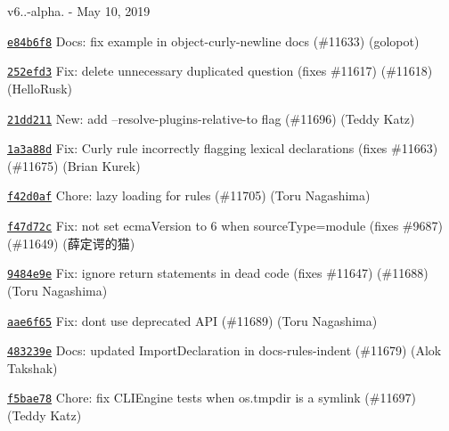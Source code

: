 v6..-\/alpha. -\/ May 10, 2019


\begin{DoxyItemize}
\item \href{https://github.com/eslint/eslint/commit/e84b6f8b171ba4266164688f76d5ee45d278e5c2}{\texttt{ {\ttfamily e84b6f8}}} Docs\+: fix example in object-\/curly-\/newline docs (\#11633) (golopot)
\item \href{https://github.com/eslint/eslint/commit/252efd337b1441debb6d2cc8f51a625549b2c535}{\texttt{ {\ttfamily 252efd3}}} Fix\+: delete unnecessary duplicated question (fixes \#11617) (\#11618) (Hello\+Rusk)
\item \href{https://github.com/eslint/eslint/commit/21dd2116c70b93aa8dd50d2b15e202724b11486a}{\texttt{ {\ttfamily 21dd211}}} New\+: add --resolve-\/plugins-\/relative-\/to flag (\#11696) (Teddy Katz)
\item \href{https://github.com/eslint/eslint/commit/1a3a88df2f952c34631d8e1d83de47178826fce0}{\texttt{ {\ttfamily 1a3a88d}}} Fix\+: Curly rule incorrectly flagging lexical declarations (fixes \#11663) (\#11675) (Brian Kurek)
\item \href{https://github.com/eslint/eslint/commit/f42d0afd89874b459fce1eb1998247d53f9aa42b}{\texttt{ {\ttfamily f42d0af}}} Chore\+: lazy loading for rules (\#11705) (Toru Nagashima)
\item \href{https://github.com/eslint/eslint/commit/f47d72ce2f2edb80cd38810894b9d4bda896bb29}{\texttt{ {\ttfamily f47d72c}}} Fix\+: not set ecma\+Version to 6 when source\+Type=module (fixes \#9687) (\#11649) (薛定谔的猫)
\item \href{https://github.com/eslint/eslint/commit/9484e9ea188ff70683c3112e397c7fddcc3f8095}{\texttt{ {\ttfamily 9484e9e}}} Fix\+: ignore return statements in dead code (fixes \#11647) (\#11688) (Toru Nagashima)
\item \href{https://github.com/eslint/eslint/commit/aae6f6525557ba06e73f051511646056313fcf91}{\texttt{ {\ttfamily aae6f65}}} Fix\+: don\textquotesingle{}t use deprecated A\+PI (\#11689) (Toru Nagashima)
\item \href{https://github.com/eslint/eslint/commit/483239ec74a0c13529fc99547a784b749f41dd54}{\texttt{ {\ttfamily 483239e}}} Docs\+: updated Import\+Declaration in docs-\/rules-\/indent (\#11679) (Alok Takshak)
\item \href{https://github.com/eslint/eslint/commit/f5bae78c19d5359f67969a2ff344025082e253f4}{\texttt{ {\ttfamily f5bae78}}} Chore\+: fix C\+L\+I\+Engine tests when os.\+tmpdir is a symlink (\#11697) (Teddy Katz)

\end{DoxyItemize}
